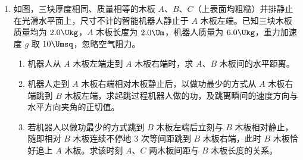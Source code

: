 \documentclass[\gkver]{gaokaozhenti}
\begin{document}
\begin{enumerate}
{当 $OA$ 运动到与细框一边平行时瞬间，切割的有效长度最短，感应电流最小，$CD$ 棒受到的安培力最小，得 $E_{\min}=BL_{\min}\overline{v}=B\cdot L\cdot\frac{L\omega}{2}=\frac{BL^{2}\omega}{2}$

故 $CD$ 棒所受的安培力最小为 $F_{\min}=BI_{\min}L=\frac{B^{2}L^{3}\omega}{2R}$

（2）当 $CD$ 棒受到的安培力最小时根据平衡条件得 $mg\sin\theta-\mu mg\cos\theta-F_{\min}=0$

当 $CD$ 棒受到的安培力最大时根据平衡条件得 $F_{\max}-mg\sin\theta-\mu mg\cos\theta=0$

联立解得 $m=\frac{3B^{2}L^{3}\omega}{4Rg\sin\theta}$

撤去推力瞬间，根据牛顿第二定律得 $F_{\max} + \mu mg \cos \theta - mg \sin \theta = ma$

解得 $\mu = \frac{a}{g \cos \theta} - \frac{\tan \theta}{3}$
}

\item
如图，三块厚度相同、质量相等的木板 $A$、$B$、$C$（上表面均粗糙）并排静止在光滑水平面上，尺寸不计的智能机器人静止于 $A$ 木板左端。已知三块木板质量均为 $2.0 \Ukg$，$A$ 木板长度为 $2.0 \Um$，机器人质量为 $6.0 \Ukg$，重力加速度 $g$ 取 $10 \Umsq$，忽略空气阻力。
\begin{enumerate}
	\item
	机器人从 $A$ 木板左端走到 $A$ 木板右端时，求 $A$、$B$ 木板间的水平距离。
	\item
	机器人走到 $A$ 木板右端相对木板静止后，以做功最少的方式从 $A$ 木板右端跳到 $B$ 木板左端，求起跳过程机器人做的功，及跳离瞬间的速度方向与水平方向夹角的正切值。
	\item
	若机器人以做功最少的方式跳到 $B$ 木板左端后立刻与 $B$ 木板相对静止，随即相对 $B$ 木板连续不停地 3 次等间距跳到 $B$ 木板右端，此时 $B$ 木板恰好追上 $A$ 木板。求该时刻 $A$、$C$ 两木板间距与 $B$ 木板长度的关系。
\end{enumerate}

\end{enumerate}
\end{document}
